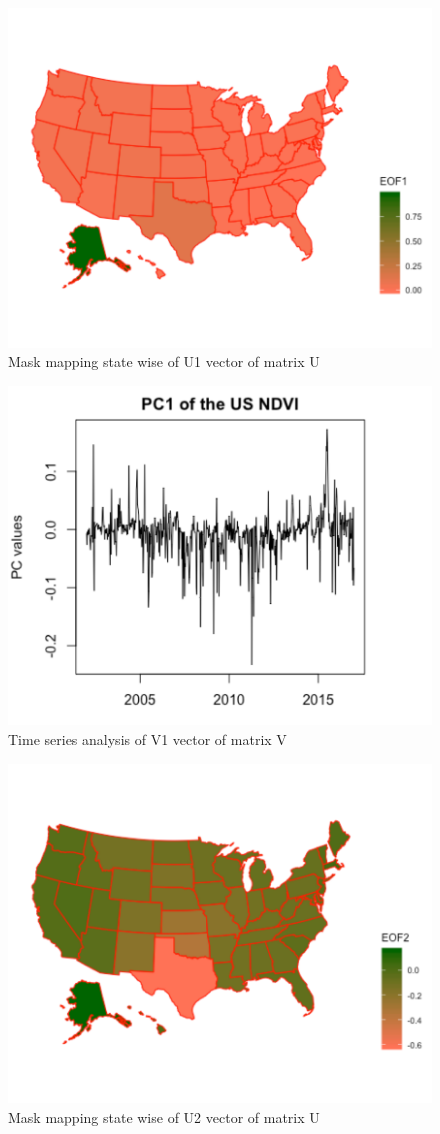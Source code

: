      \begin{figure}[H]
            \centering
            \includegraphics[width=0.70\linewidth]{figures/ch5/SVD/eof1.png}
            \caption{\label{fig:EOF_1} Mask mapping state wise of U1 vector of matrix U}
    \end{figure}
    
     \begin{figure}[H]
            \centering
            \includegraphics[width=0.70\linewidth]{figures/ch5/SVD/pc1.png}
            \caption{\label{fig:V_1} Time series analysis of V1 vector of matrix V}
    \end{figure}
    
    \begin{figure}[H]
            \centering
            \includegraphics[width=0.70\linewidth]{figures/ch5/SVD/eof2.png}
            \caption{\label{fig:EOF_2} Mask mapping state wise of U2 vector of matrix U}
    \end{figure}
    
